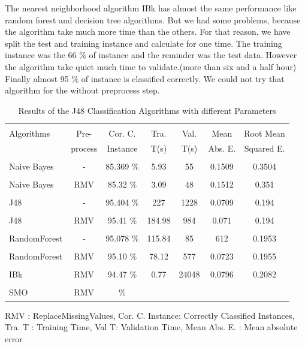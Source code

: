 \documentclass[a4paper]{article}
\begin{document}
The nearest neighborhood algorithm IBk has almost the same performance like random forest and decision tree algorithms. But we had some problems, because the algorithm take much more time than the others. For that reason, we have split the test and training instance and calculate for one time. The training instance was the  66 $\%$ of instance and the reminder was the test data. However the algorithm take quiet much time to validate.(more than six and a half hour) Finally almost 95 $\%$ of instance is classified correctly. We could not try that algorithm for the without preprocess step.


\begin{table}
\begin{tabular}{|l| c | c | c | c |c |c |}

\hline & & & & & & \\
Algorithms & Pre- & Cor. C.& Tra. & Val. & Mean & Root Mean \\
 & process  & Instance & T(s) &  T(s) &  Abs. E. & Squared E. \\
\hline & & & & & & \\
Naive Bayes		& - &			85.369  $\%$ &  5.93	& 55 &  0.1509  & 0.3504 \\ 
\hline & & & & & & \\
Naive Bayes	 	& RMV &	85.32 $\%$ & 3.09 & 48	 &  0.1512  & 0.351  \\ 
\hline & & & & & & \\
J48	 		& - &			 95.404  $\%$ & 227 & 1228 &  0.0709 & 0.194\\ 
\hline 	& & & & & & \\
J48  			& RMV &			95.41 $\%$ & 184.98 & 984 &  0.071 & 0.194 \\ 
\hline & & & & & & \\
RandomForest  	 & - &			95.078 $\%$ & 115.84 & 85 &  612 & 0.1953 \\ 
\hline & & & & & & \\
RandomForest 	& RMV &			 95.10 $\%$ & 78.12 &  577  & 0.0723 & 0.1955 \\ 
\hline & & & & & & \\
IBk 			& RMV &			94.47 $\%$ & 0.77 &  24048 & 0.0796 & 0.2082\\ 
\hline & & & & & & \\
SMO 			& RMV &			 $\%$ &  &    &   &  \\ 
\hline
\end{tabular}
\caption{Results of the J48 Classification Algorithms with different Parameters}
    RMV : ReplaceMissingValues,
	Cor. C. Instance:  Correctly Classified Instances,
	Tra. T : Training Time,
	Val T: Validation Time,
	Mean Abs. E. : Mean absolute error 
\end{table}
\end{document}
